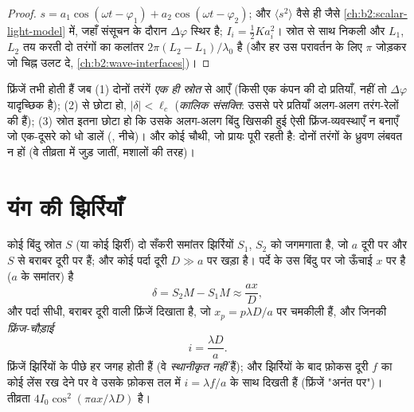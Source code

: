 \begin{proof}
$s = a_1\cos(\omega t - \varphi_1) + a_2\cos(\omega t - \varphi_2)$; और $\langle s^2\rangle$ वैसे ही जैसे
\cref{ch:b2:scalar-light-model} में, जहाँ संसूचन के दौरान $\Delta\varphi$ स्थिर है;
$I_i = \tfrac12Ka_i^2$। स्रोत से साथ निकली और  $L_1$, $L_2$ तय
करती दो तरंगों का कलांतर
$2\pi(L_2 - L_1)/\lambda_0$ है (और हर उस परावर्तन के लिए $\pi$ जोड़कर जो चिह्न
उलट दे, \cref{ch:b2:wave-interfaces})।
\end{proof}

\begin{remark}[तीन शर्तें]\label{rem:b2:two-wave-interference:conditions}
फ्रिंजें तभी होती हैं जब (1) दोनों तरंगें \emph{एक ही स्रोत} से आएँ
(किसी एक कंपन की दो प्रतियाँ, नहीं तो $\Delta\varphi$ यादृच्छिक है); (2)
  से छोटा हो, $|\delta| < \ell_c$
(\emph{कालिक संसक्ति}: उससे परे प्रतियाँ अलग-अलग
तरंग-रेलों की हैं); (3) स्रोत इतना छोटा हो कि उसके अलग-अलग बिंदु
खिसकी हुई ऐसी फ्रिंज-व्यवस्थाएँ न बनाएँ जो एक-दूसरे को धो डालें
(\emph{}, नीचे)। और कोई चौथी, जो प्रायः पूरी रहती है:
दोनों तरंगों के ध्रुवण लंबवत न हों (वे तीव्रता में जुड़ जातीं,
मशालों की तरह)।
\end{remark}

\section{यंग की झिर्रियाँ}

\begin{proposition}[तरंगाग्र-विभाजन: यंग का प्रयोग]\label{prop:b2:two-wave-interference:young}
कोई बिंदु स्रोत $S$ (या कोई झिर्री) दो सँकरी समांतर झिर्रियों
$S_1$, $S_2$ को जगमगाता है, जो $a$ दूरी पर और $S$ से बराबर दूरी पर हैं; और कोई पर्दा
दूरी $D \gg a$ पर खड़ा है। पर्दे के उस बिंदु पर जो ऊँचाई $x$ पर है ($a$ के
समांतर)  है
\[
\delta = S_2M - S_1M \approx \frac{ax}D ,
\]
और पर्दा सीधी, बराबर दूरी वाली फ्रिंजें दिखाता है, जो $x_p =
p\lambda D/a$ पर चमकीली हैं, और जिनकी \emph{फ्रिंज-चौड़ाई}
\[
i = \frac{\lambda D}a .
\]
फ्रिंजें झिर्रियों के पीछे हर जगह होती हैं (वे \emph{स्थानीकृत
नहीं} हैं); और झिर्रियों के बाद फ़ोकस दूरी $f$ का कोई लेंस रख देने पर वे
उसके फ़ोकस तल में $i = \lambda f/a$ के साथ दिखती हैं (फ्रिंजें "अनंत पर")।
तीव्रता $4I_0\cos^2(\pi ax/\lambda D)$ है।
\end{proposition}

